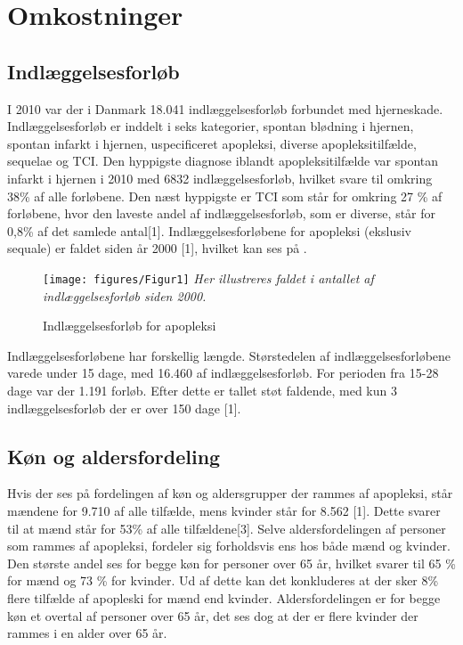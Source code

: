 \section{Omkostninger}

\subsection{Indlæggelsesforløb}
I 2010 var der i Danmark 18.041 indlæggelsesforløb forbundet med hjerneskade. Indlæggelsesforløb er inddelt i seks kategorier, spontan blødning i hjernen, spontan infarkt i hjernen, uspecificeret apopleksi, diverse apopleksitilfælde, sequelae og TCI.  Den hyppigste diagnose iblandt apopleksitilfælde var spontan infarkt i hjernen i 2010 med 6832 indlæggelsesforløb, hvilket svare til omkring 38\% af alle forløbene. Den næst hyppigste er TCI som står for omkring 27 \% af forløbene, hvor den laveste andel af indlæggelsesforløb, som er diverse, står for 0,8\% af det samlede antal[1].  Indlæggelsesforløbene for apopleksi (ekslusiv sequale) er faldet siden år 2000 [1], hvilket kan ses på .

\begin{figure}[H]
	\caption{Indlæggelsesforløb for apopleksi}
	\label{Indlaeggelser}
	\centering
	\texttt{[image: figures/Figur1]}
	\flushleft
	\textit{Her illustreres faldet i antallet af indlæggelsesforløb siden 2000.}
\end{figure}

Indlæggelsesforløbene har forskellig længde. Størstedelen af indlæggelsesforløbene varede under 15 dage, med 16.460 af indlæggelsesforløb. For perioden fra 15-28 dage var der 1.191 forløb. Efter dette er tallet støt faldende, med kun 3 indlæggelsesforløb der er over 150 dage [1].

\subsection{Køn og aldersfordeling}
Hvis der ses på fordelingen af køn og aldersgrupper der rammes af apopleksi, står mændene for 9.710 af alle tilfælde, mens kvinder står for 8.562 [1]. Dette svarer til at mænd står for 53\% af alle tilfældene[3]. Selve aldersfordelingen af personer som rammes af apopleksi, fordeler sig forholdsvis ens hos både mænd og kvinder. Den største andel ses for begge køn for personer over 65 år, hvilket svarer til 65 \% for mænd og  73 \% for kvinder. Ud af dette kan det konkluderes at der sker 8\% flere tilfælde af apopleski for mænd end kvinder. Aldersfordelingen er for begge køn et overtal af personer over 65 år, det ses dog at der er flere kvinder der rammes i en alder over 65 år. %

